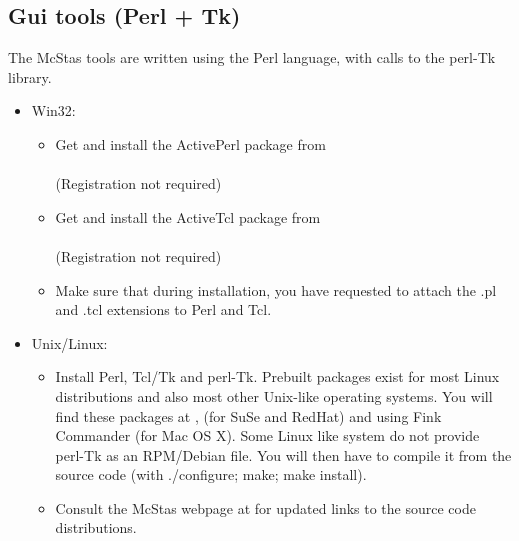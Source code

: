\subsection{Gui tools (Perl + Tk)}
\label{s:perltk}

The McStas tools are written using the Perl language, with calls to the perl-Tk library.

\begin{itemize}
\item{Win32:}
  \begin{itemize}
  \item{Get and install the ActivePerl package from\\
      \\(Registration
      not required)}
  \item{Get and install the ActiveTcl package from\\
      \\(Registration
      not required)}
  \item{Make sure that during installation, you have requested to attach the .pl and .tcl extensions to Perl and Tcl.}
  \end{itemize}
\item{Unix/Linux:}
  \begin{itemize}
    \item{Install Perl, Tcl/Tk and perl-Tk. Prebuilt packages exist for
      most Linux distributions and also most other Unix-like operating
      systems. You will find these packages at ,  (for SuSe and RedHat) and using Fink Commander (for Mac OS X). Some Linux like system do not provide perl-Tk as an RPM/Debian file. You will then have to compile it from the source code (with ./configure; make; make install).}
    \item{Consult the McStas webpage at  for updated links to the source code distributions.}
    \end{itemize}
  \end{itemize}
  
